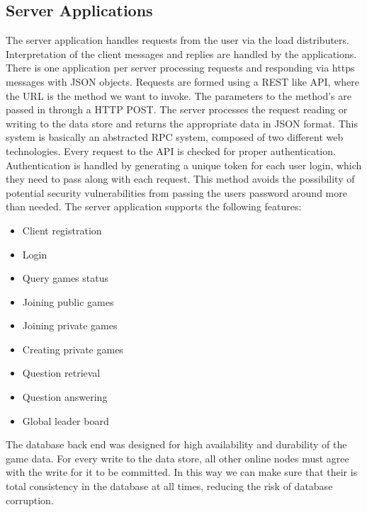 \documentclass{dependencies/acm_proc_article-sp}
\begin{document}
\subsection{Server Applications}
The server application handles requests from the user via the load distributers.
Interpretation of the client messages and replies are handled by the applications. There is one application per server processing requests and responding via https messages with JSON objects. Requests are formed using a REST like API, where the URL is the method we want to invoke. The parameters to the method's are passed in through a HTTP POST. The server processes the request reading or writing to the data store and returns the appropriate data in JSON format. This system is basically an abstracted RPC system, composed of two different web technologies. Every request to the API is checked for proper authentication. Authentication is handled by generating a unique token for each user login, which they need to pass along with each request. This method avoids the possibility of potential security vulnerabilities from passing the users password around more than needed. 
The server application supports the following features:
\begin{itemize}	
\item Client registration
\item Login
\item Query games status
\item Joining public games
\item Joining private games
\item Creating private games
\item Question retrieval
\item Question answering
\item Global leader board
\end{itemize}

The database back end was designed for high availability and durability of the game data. For every write to the data store, all other online nodes must agree with the write for it to be committed. In this way we can make sure that their is total consistency in the database at all times, reducing the risk of database corruption. 
\end{document}
